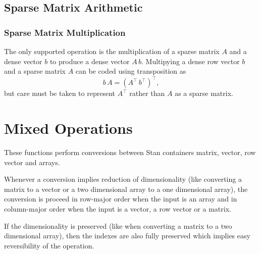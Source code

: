 \section{Sparse Matrix Arithmetic}

\subsection{Sparse Matrix Multiplication}

The only supported operation is the multiplication of a sparse matrix
$A$ and a dense vector $b$ to produce a dense vector $A\,b$.
Multipying a dense row vector $b$ and a sparse matrix $A$ 
can be coded using transposition as
\[
b \, A = (A^{\top} \, b^{\top})^{\top},
\]
but care must be taken to represent $A^{\top}$ rather than $A$ as a
sparse matrix.

\begin{description}
\end{description}



\chapter{Mixed Operations}

These functions perform conversions between Stan containers matrix,
vector, row vector and arrays.

Whenever a conversion implies reduction of dimensionality (like
converting a matrix to a vector or a two dimensional array to a one
dimensional array), the conversion is proceed in row-major order when
the input is an array and in column-major order when the input is a
vector, a row vector or a matrix.

If the dimensionality is preserved (like when converting a matrix to a
two dimensional array), then the indexes are also fully preserved
which implies easy reversibility of the operation.

